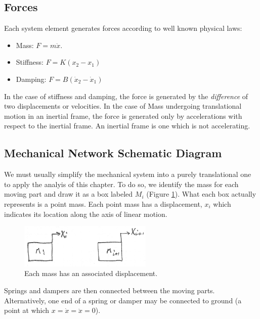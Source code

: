 \subsection{Forces}

Each system element generates forces according to well known physical laws:

\begin{itemize}
  \item Mass:  $F=m\ddot{x}$.
  \item Stiffness:  $F= K(x_2-x_1)$
  \item Damping:    $F= B(\dot{x}_2- \dot{x}_1)$
\end{itemize}

In the case of stiffness and damping, the force is generated by the {\it difference} of two displacements or velocities.   In the case of Mass undergoing translational motion in an inertial frame, the force is generated only by accelerations with respect to the inertial frame.   An inertial frame is one which is not accelerating.

\subsection{Mechanical Network Schematic Diagram}

We must usually simplify the mechanical system into a purely translational one to apply the analyis of this chapter.   To do so, we identify the mass for each moving part and draw it as a box labeled $M_i$ (Figure \ref{masses}).   What each box actually represents is a point mass.  Each point mass has a displacement, $x_i$ which indicates its location along the axis of linear motion.



\begin{figure}\centering
\includegraphics[width=2.5in]{figs02/00720a.png}
\caption{Each mass has an associated displacement.}\label{masses}
\end{figure}


Springs and dampers are then connected between the moving parts.   Alternatively, one end of a spring or damper may be connected to ground (a point at which $x = \dot{x} = \ddot{x} = 0$).

